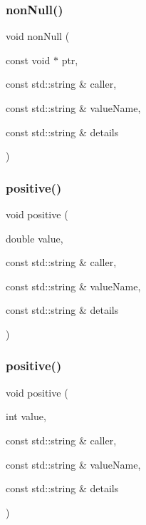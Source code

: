\subsubsection{\texorpdfstring{non\+Null()}{nonNull()}}
{\footnotesize\ttfamily void non\+Null (\begin{DoxyParamCaption}\item[{const void $\ast$}]{ptr,  }\item[{const std\+::string \&}]{caller,  }\item[{const std\+::string \&}]{value\+Name,  }\item[{const std\+::string \&}]{details }\end{DoxyParamCaption})}

\mbox{\label{namespacerequire_a332040c87f61ff35778acdf5ad074d57}} 
\subsubsection{\texorpdfstring{positive()}{positive()}\hspace{0.1cm}{\footnotesize\ttfamily [1/2]}}
{\footnotesize\ttfamily void positive (\begin{DoxyParamCaption}\item[{double}]{value,  }\item[{const std\+::string \&}]{caller,  }\item[{const std\+::string \&}]{value\+Name,  }\item[{const std\+::string \&}]{details }\end{DoxyParamCaption})}

\mbox{\label{namespacerequire_a64d94146fb46d01da7e8eb081c76562d}} 
\subsubsection{\texorpdfstring{positive()}{positive()}\hspace{0.1cm}{\footnotesize\ttfamily [2/2]}}
{\footnotesize\ttfamily void positive (\begin{DoxyParamCaption}\item[{int}]{value,  }\item[{const std\+::string \&}]{caller,  }\item[{const std\+::string \&}]{value\+Name,  }\item[{const std\+::string \&}]{details }\end{DoxyParamCaption})}


